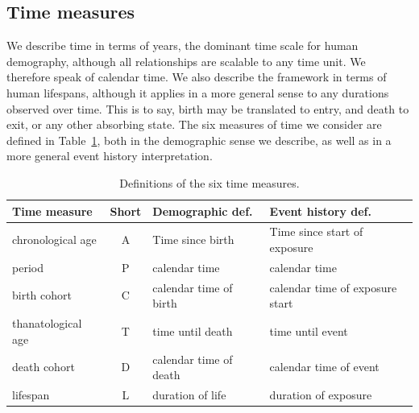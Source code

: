 \documentclass[12pt,oneside,a4paper]{article} %
\theoremstyle{definition}
\begin{document}

\FloatBarrier
\subsection{Time measures}
\FloatBarrier
We describe time in terms of years, the dominant time scale for human
demography, although all relationships are scalable to any time unit. We therefore speak of calendar time. We also describe the framework in terms
of human lifespans, although it applies in a more general sense to any durations
observed over time. This is to say, birth may be translated to entry, and death
to exit, or any other absorbing state. The six measures of time we consider are
defined in Table~\ref{tab:sixdefs}, both in the demographic sense we describe, as well as in a more general event history interpretation.

\FloatBarrier
\begin{table}[ht!]
\centering
\caption{Definitions of the six time measures.}
\label{tab:sixdefs}
\begin{adjustwidth}{0em}{0em}
\begin{tabular}{lcll}
\hline 
\textbf{Time measure} & \textbf{Short} & \textbf{Demographic def.} &
\textbf{Event history def.}\\
\hline 
chronological age & A & Time since birth & Time since start of exposure \\
period & P & calendar time & calendar time \\
birth cohort & C & calendar time of birth & calendar time of exposure start \\
thanatological age & T & time until death & time until event \\
death cohort & D & calendar time of death & calendar time of event \\
lifespan & L & duration of life & duration of exposure \\
\end{tabular}
\end{adjustwidth}
\end{table}
\end{document}
